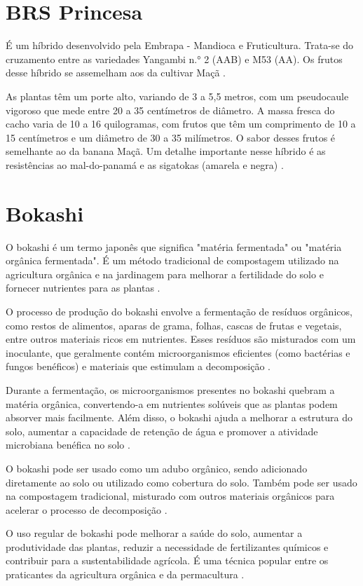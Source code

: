 \section{BRS Princesa}
É um híbrido desenvolvido pela Embrapa - Mandioca e Fruticultura. Trata-se do cruzamento entre as variedades Yangambi n.° 2 (AAB) e M53 (AA). Os frutos desse híbrido se assemelham aos da cultivar Maçã \cite{cultivodebananeira}. 

As plantas têm um porte alto, variando de 3 a 5,5 metros, com um pseudocaule vigoroso que mede entre 20 a 35 centímetros de diâmetro. A massa fresca do cacho varia de 10 a 16 quilogramas, com frutos que têm um comprimento de 10 a 15 centímetros e um diâmetro de 30 a 35 milímetros. O sabor desses frutos é semelhante ao da banana Maçã. Um detalhe importante nesse híbrido é as resistências ao mal-do-panamá e as sigatokas (amarela e negra) \cite{cultivodebananeira}.


\section{Bokashi}
O bokashi é um termo japonês que significa "matéria fermentada" ou "matéria orgânica fermentada". É um método tradicional de compostagem utilizado na agricultura orgânica e na jardinagem para melhorar a fertilidade do solo e fornecer nutrientes para as plantas \cite{bokashi1}.

O processo de produção do bokashi envolve a fermentação de resíduos orgânicos, como restos de alimentos, aparas de grama, folhas, cascas de frutas e vegetais, entre outros materiais ricos em nutrientes. Esses resíduos são misturados com um inoculante, que geralmente contém microorganismos eficientes (como bactérias e fungos benéficos) e materiais que estimulam a decomposição \cite{bokashi1}.

Durante a fermentação, os microorganismos presentes no bokashi quebram a matéria orgânica, convertendo-a em nutrientes solúveis que as plantas podem absorver mais facilmente. Além disso, o bokashi ajuda a melhorar a estrutura do solo, aumentar a capacidade de retenção de água e promover a atividade microbiana benéfica no solo \cite{bokashi1}.

O bokashi pode ser usado como um adubo orgânico, sendo adicionado diretamente ao solo ou utilizado como cobertura do solo. Também pode ser usado na compostagem tradicional, misturado com outros materiais orgânicos para acelerar o processo de decomposição \cite{bokashi1}.

O uso regular de bokashi pode melhorar a saúde do solo, aumentar a produtividade das plantas, reduzir a necessidade de fertilizantes químicos e contribuir para a sustentabilidade agrícola. É uma técnica popular entre os praticantes da agricultura orgânica e da permacultura \cite{bokashi2}.
